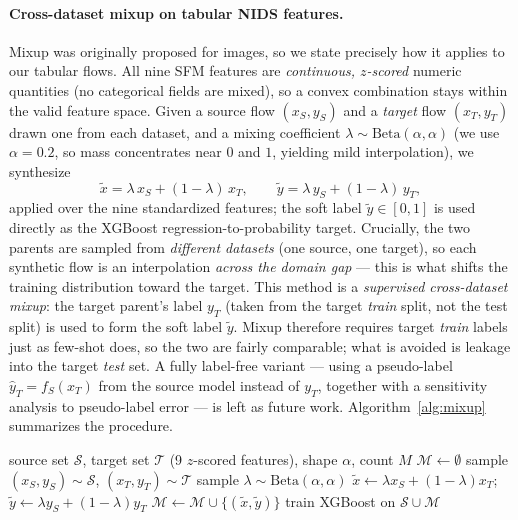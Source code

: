 \documentclass[preprint,12pt,authoryear]{elsarticle}
\begin{document}
\paragraph{Cross-dataset mixup on tabular NIDS features.} Mixup was originally
proposed for images, so we state precisely how it applies to our tabular flows.
All nine SFM features are \emph{continuous, $z$-scored} numeric quantities (no
categorical fields are mixed), so a convex combination stays within the valid
feature space. Given a source flow $(x_S, y_S)$ and a \emph{target} flow
$(x_T, y_T)$ drawn one from each dataset, and a mixing coefficient
$\lambda \sim \mathrm{Beta}(\alpha,\alpha)$ (we use $\alpha=0.2$, so mass
concentrates near $0$ and $1$, yielding mild interpolation), we synthesize
\begin{equation}
\tilde{x} = \lambda\, x_S + (1-\lambda)\, x_T,
\qquad
\tilde{y} = \lambda\, y_S + (1-\lambda)\, y_T,
\label{eq:mixup}
\end{equation}
applied over the nine standardized features; the soft label $\tilde{y}\in[0,1]$ is
used directly as the XGBoost regression-to-probability target. Crucially, the two
parents are sampled from \emph{different datasets} (one source, one target),
so each synthetic flow is an interpolation \emph{across the domain gap} --- this is
what shifts the training distribution toward the target. This method is a
\emph{supervised cross-dataset mixup}: the target parent's label $y_T$ (taken from
the target \emph{train} split, not the test split) is used to form the soft label
$\tilde{y}$. Mixup therefore requires target \emph{train} labels just as few-shot
does, so the two are fairly comparable; what is avoided is leakage into the target
\emph{test} set. A fully label-free variant --- using a pseudo-label
$\hat{y}_T = f_S(x_T)$ from the source model instead of $y_T$, together with a
sensitivity analysis to pseudo-label error --- is left as future work.
Algorithm~\ref{alg:mixup} summarizes the procedure.

\begin{algorithm}[h]
\caption{Cross-dataset mixup for tabular NIDS features}
\label{alg:mixup}
\begin{algorithmic}[1]
\Require source set $\mathcal{S}$, target set $\mathcal{T}$ (9 $z$-scored
features), shape $\alpha$, count $M$
\State $\mathcal{M} \gets \emptyset$
  \State sample $(x_S,y_S)\sim\mathcal{S}$, $(x_T,y_T)\sim\mathcal{T}$
  \State sample $\lambda \sim \mathrm{Beta}(\alpha,\alpha)$
  \State $\tilde{x} \gets \lambda x_S + (1-\lambda) x_T$;\;
         $\tilde{y} \gets \lambda y_S + (1-\lambda) y_T$
  \State $\mathcal{M} \gets \mathcal{M} \cup \{(\tilde{x},\tilde{y})\}$
\EndFor
\State \Return train XGBoost on $\mathcal{S}\cup\mathcal{M}$
\end{algorithmic}
\end{algorithm}
\end{document}
